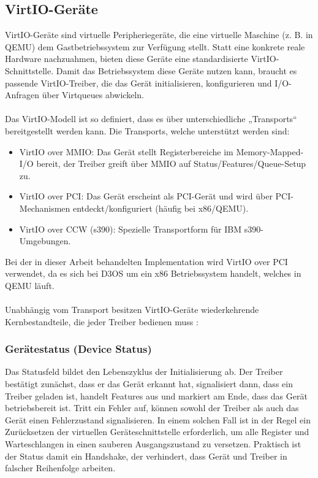 \subsection{VirtIO-Geräte}

VirtIO-Geräte sind virtuelle Peripheriegeräte, die eine virtuelle Maschine (z. B. in QEMU) dem Gastbetriebssystem zur Verfügung stellt. Statt eine konkrete reale Hardware nachzuahmen, bieten diese Geräte eine standardisierte VirtIO-Schnittstelle. Damit das Betriebssystem diese Geräte nutzen kann, braucht es passende VirtIO-Treiber, die das Gerät initialisieren, konfigurieren und I/O-Anfragen über Virtqueues abwickeln.\\
\\
Das VirtIO-Modell ist so definiert, dass es über unterschiedliche „Transports“ bereitgestellt werden kann. Die Transports, welche unterstützt werden sind:

\begin{itemize}
 \item VirtIO over MMIO: Das Gerät stellt Registerbereiche im Memory-Mapped-I/O bereit, der Treiber greift über MMIO auf Status/Features/Queue-Setup zu.
 \item VirtIO over PCI: Das Gerät erscheint als PCI-Gerät und wird über PCI-Mechanismen entdeckt/konfiguriert (häufig bei x86/QEMU).
 \item VirtIO over CCW (s390): Spezielle Transportform für IBM s390-Umgebungen.
\end{itemize}

Bei der in dieser Arbeit behandelten Implementation wird VirtIO over PCI verwendet, da es sich bei D3OS um ein x86 Betriebssystem handelt, welches in QEMU läuft.\\
\\
Unabhängig vom Transport besitzen VirtIO-Geräte wiederkehrende Kernbestandteile, die jeder Treiber bedienen muss \cite{RedHatOverview}:

\subsubsection{Gerätestatus (Device Status)}
Das Statusfeld bildet den Lebenszyklus der Initialisierung ab. Der Treiber bestätigt zunächst, dass er das Gerät erkannt hat, signalisiert dann, dass ein Treiber geladen ist, handelt Features aus und markiert am Ende, dass das Gerät betriebsbereit ist. Tritt ein Fehler auf, können sowohl der Treiber als auch das Gerät einen Fehlerzustand signalisieren. In einem solchen Fall ist in der Regel ein Zurücksetzen der virtuellen Geräteschnittstelle erforderlich, um alle Register und Warteschlangen in einen sauberen Ausgangszustand zu versetzen.
Praktisch ist der Status damit ein Handshake, der verhindert, dass Gerät und Treiber in falscher Reihenfolge arbeiten.

